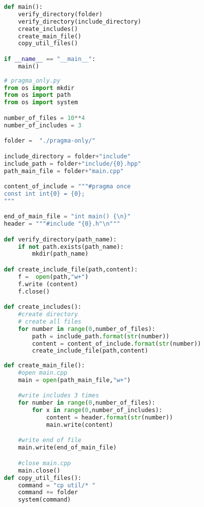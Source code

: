 \begin{apendicesenv}
\begin{lstlisting}[language=Python, caption={
    Script \textit{Pragma Once} primeiro que Guardas de Inclusão Interna},label=script_pragma_guards_include]
def main():
    verify_directory(folder)
    verify_directory(include_directory)
    create_includes()
    create_main_file()
    copy_util_files()

if __name__ == "__main__":
    main()
\end{lstlisting}

\begin{lstlisting}[language=Python, caption={
                     Script Pragma Once},
             label=script_pragma_once_include]
# pragma_only.py
from os import mkdir
from os import path
from os import system

number_of_files = 10**4
number_of_includes = 3

folder =  "./pragma-only/"

include_directory = folder+"include"
include_path = folder+"include/{0}.hpp"
path_main_file = folder+"main.cpp"

content_of_include = """#pragma once
const int int{0} = {0};
"""

end_of_main_file = "int main() {\n}"
header = """#include "{0}.h"\n"""

def verify_directory(path_name):
    if not path.exists(path_name):
        mkdir(path_name)

def create_include_file(path,content):
    f =  open(path,"w+")
    f.write (content)
    f.close()

def create_includes():
    #create directory
    # create all files
    for number in range(0,number_of_files):
        path = include_path.format(str(number))
        content = content_of_include.format(str(number))
        create_include_file(path,content)
    
def create_main_file():
    #open main.cpp
    main = open(path_main_file,"w+")

    #write includes 3 times
    for number in range(0,number_of_files):
        for x in range(0,number_of_includes):
            content = header.format(str(number))
            main.write(content)

    #write end of file
    main.write(end_of_main_file)

    #close main.cpp
    main.close()
def copy_util_files():                                                           
    command = "cp util/* "                                                       
    command += folder                                                            
    system(command)                                                              
                      


\end{lstlisting}
\end{apendicesenv}
